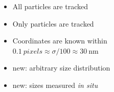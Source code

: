 \documentclass{beamer}
\begin{document}
\begin{frame}
\begin{columns}
	\\
	\footnotesize{\citet{Crocker1996}}	
	
	\bigskip
	
	\begin{itemize}
		\item All particles are tracked
		\item Only particles are tracked
		\item Coordinates are known within\\
			$\SI{0.1}{pixels} \approx \sigma/100 \approx \SI{30}{\nano\metre}$
		\item \alert{new}: arbitrary size distribution
		\item \alert{new}: sizes measured \emph{in situ}
	\end{itemize}
	\end{columns}
\end{frame}
\end{document}
